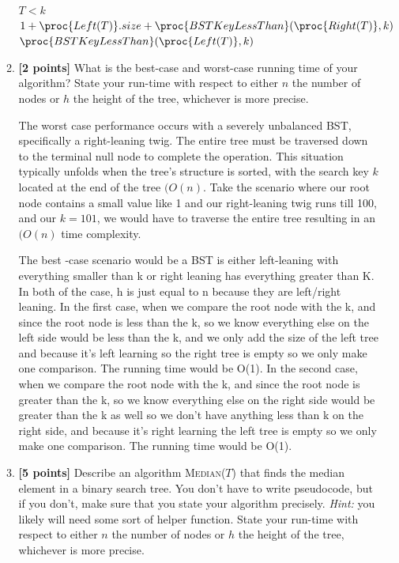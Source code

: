 \documentclass[11pt]{article}
\begin{document}
\begin{enumerate}
\begin{enumerate}
\begin{codebox}
\li \If $T < k$
\li  \Return $1 + \proc{Left(T)}.size + \proc{BSTKeyLessThan}(\proc{Right(T)}, k)$
\li \Else
\li     \Return $\proc{BSTKeyLessThan}(\proc{Left(T)}, k)$
    \End
\end{codebox}





\item \textbf{[2 points]}  What is the best-case and worst-case running time of your algorithm?  State your run-time with respect to either $n$ the number of nodes or $h$ the height of the tree, whichever is more precise.

The worst case performance occurs with a severely unbalanced BST, specifically a right-leaning twig. The entire tree must be traversed down to the terminal null node to complete the operation. This situation typically unfolds when the tree's structure is sorted, with the search key $k$ located at the end of the tree $(O(n)$. Take the scenario where our root node contains a small value like 1 and our right-leaning twig runs till 100, and our $k=101$, we would have to traverse the entire tree resulting in an $(O(n)$ time complexity.

The best -case scenario would be a BST is  either left-leaning with everything smaller than k  or right leaning has everything greater  than K. In both of the case, h is just equal to n because they are left/right leaning. In the first case, when we compare the root node with the k, and since the root node is less than the k, so we know everything else on the left side would be less than the k, and we only add the size of the left tree and because it's left learning  so the right tree is empty so we only make one comparison.  The running time would be O(1). In the second case, when we compare the root node with the k, and since the root node is greater than the k, so we know everything else on the right side would be greater than the k as well so we don't have anything less than k on the right side, and  because it's right learning the left tree is empty so we only make one comparison. The running time would be O(1).
\item \textbf{[5 points]}  Describe an algorithm \textsc{Median($T$)} that finds the median element in a binary search tree.  You don't have to write pseudocode, but if you don't, make sure that you state your algorithm precisely.  \emph{Hint:} you likely will need some sort of helper function.  State your run-time with respect to either $n$ the number of nodes or $h$ the height of the tree, whichever is more precise.
 

\end{enumerate}
\end{enumerate}
\end{document}
